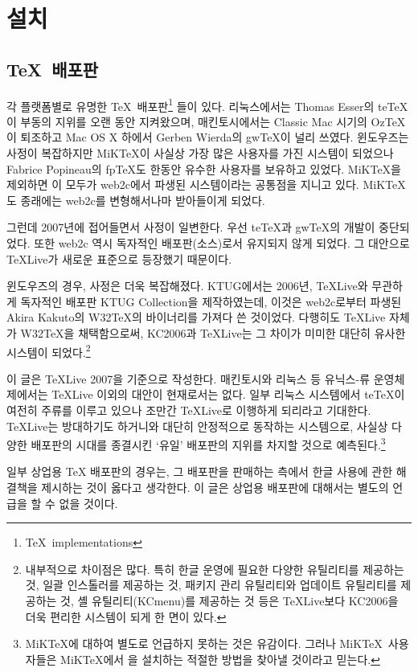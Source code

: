 \chapter{설치}

\section{\TeX\ 배포판}

각 플랫폼별로 유명한 \TeX\ 배포판\footnote{%
  \TeX~implementations}%
들이 있다. 리눅스에서는 Thomas Esser의 te\TeX 이 부동의 지위를 오랜 동안
지켜왔으며,
매킨토시에서는 Classic Mac 시기의 Oz\TeX 이 퇴조하고 Mac OS X 하에서
Gerben Wierda의 gw\TeX 이 널리 쓰였다. 
윈도우즈는 사정이 복잡하지만 MiK\TeX 이 사실상 가장 많은 사용자를 가진
시스템이 되었으나 Fabrice Popineau의 fp\TeX 도 한동안 유수한
사용자를 보유하고 있었다. MiK\TeX 을 제외하면 이 모두가 web2c에서
파생된 시스템이라는 공통점을 지니고 있다. MiK\TeX 도 종래에는
web2c를 변형해서나마 받아들이게 되었다. 

그런데 2007년에 접어들면서 사정이 일변한다. 우선 te\TeX 과
gw\TeX 의 개발이 중단되었다. 또한 web2c 역시 독자적인 배포판(소스)로서
유지되지 않게 되었다. 그 대안으로 \TeX{}Live가 새로운 표준으로
등장했기 때문이다.

윈도우즈의 경우, 사정은 더욱 복잡해졌다. KTUG에서는 2006년, \TeX{}Live와
무관하게 독자적인 배포판 KTUG Collection을 제작하였는데, 이것은
web2c로부터 파생된 Akira Kakuto의 W32TeX의 바이너리를 가져다 쓴
것이었다. 다행히도 \TeX{}Live 자체가 W32TeX을 채택함으로써,
KC2006과 \TeX{}Live는 그 차이가 미미한 대단히 유사한 시스템이
되었다.\footnote{%
  내부적으로 차이점은 많다. 특히 한글 운영에 필요한 다양한
  유틸리티를 제공하는 것, 일괄 인스톨러를 제공하는 것, 패키지
  관리 유틸리티와 업데이트 유틸리티를 제공하는 것, 셸 유틸리티(KCmenu)를
  제공하는 것 등은 \TeX{}Live보다 KC2006을 더욱 편리한 시스템이
  되게 한 면이 있다.}
  
이 글은 \TeX{}Live 2007을 기준으로 작성한다. 
매킨토시와 리눅스 등 유닉스-류 운영체제에서는 \TeX{}Live 이외의 대안이
현재로서는 없다. 일부 리눅스 시스템에서 te\TeX 이 여전히 주류를 이루고
있으나 조만간 \TeX{}Live로 이행하게 되리라고 기대한다.
\TeX{}Live는 방대하기도 하거니와 대단히 안정적으로 동작하는
시스템으로, 사실상 다양한 배포판의 시대를 종결시킨 `유일' 배포판의
지위를 차지할 것으로 예측된다.\footnote{%
  MiK\TeX 에 대하여 별도로 언급하지 못하는 것은 유감이다.
  그러나 MiK\TeX~사용자들은 MiK\TeX 에서 \kotex 을
  설치하는 적절한 방법을 찾아낼 것이라고 믿는다.}

일부 상업용 \TeX{} 배포판의 경우는, 그 배포판을 판매하는 측에서
한글 사용에 관한 해결책을 제시하는 것이 옳다고 생각한다. 이 글은 상업용 배포판에 대해서는
별도의 언급을 할 수 없을 것이다.

